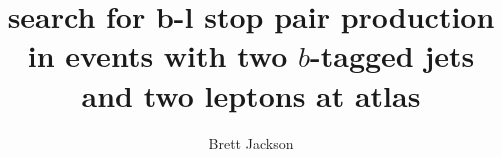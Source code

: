 
\title{search for b-l stop pair production in events with two $b$-tagged
       jets and two leptons at atlas}
    
\author{Brett Jackson}

\newcommand{\adviser}{Evelyn Thomson, Associate Professor, Physics}
\newcommand{\advisershort}{Evelyn Thomson}

\newcommand{\myinstitution}{The University of Pennsylvania}

\newcommand{\chairperson}{Marija Drndic, Professor, Physics}

\newcommand{\committeeOne}{I. Joseph Kroll, Professor, Physics}
\newcommand{\committeeTwo}{H.H. Williams, Professor, Physics}
\newcommand{\committeeThree}{Burt Ovrut, Professor, Physics}
\newcommand{\committeeFour}{--}



